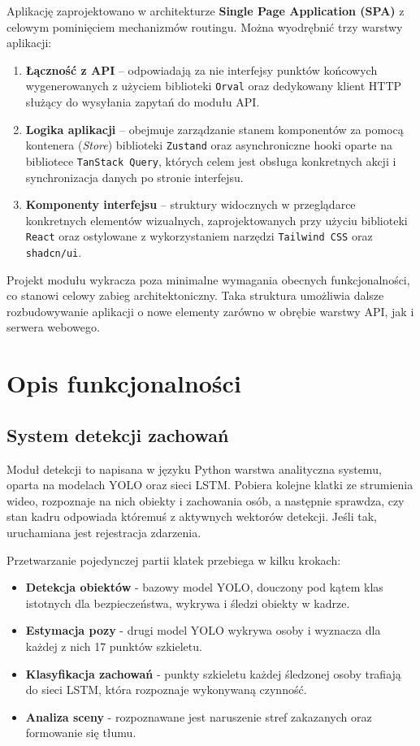 Aplikację zaprojektowano w architekturze \textbf{Single Page Application (SPA)} z celowym pominięciem mechanizmów routingu. Można wyodrębnić trzy warstwy aplikacji: 
\begin{enumerate}
    \item \textbf{Łączność z API} -- odpowiadają za nie interfejsy punktów końcowych wygenerowanych z użyciem biblioteki \texttt{Orval} oraz dedykowany klient HTTP służący do wysyłania zapytań do modułu API.
    \item \textbf{Logika aplikacji} -- obejmuje zarządzanie stanem komponentów za pomocą kontenera (\textit{Store}) biblioteki \texttt{Zustand} oraz asynchroniczne hooki oparte na bibliotece \texttt{TanStack Query}, których celem jest obsługa konkretnych akcji i synchronizacja danych po stronie interfejsu.
    \item \textbf{Komponenty interfejsu} -- struktury widocznych w przeglądarce konkretnych elementów wizualnych, zaprojektowanych przy użyciu biblioteki \texttt{React} oraz ostylowane z wykorzystaniem narzędzi \texttt{Tailwind CSS} oraz \texttt{shadcn/ui}.
\end{enumerate}

Projekt modułu wykracza poza minimalne wymagania obecnych funkcjonalności, co stanowi celowy zabieg architektoniczny. Taka struktura umożliwia dalsze rozbudowywanie aplikacji o nowe elementy zarówno w obrębie warstwy API, jak i serwera webowego.


\section{Opis funkcjonalności}

\subsection{System detekcji zachowań}


Moduł detekcji to napisana w języku Python warstwa analityczna systemu, oparta na modelach YOLO oraz sieci LSTM. Pobiera kolejne klatki ze strumienia wideo, rozpoznaje na nich obiekty i zachowania osób, a następnie sprawdza, czy stan kadru odpowiada któremuś z aktywnych wektorów detekcji. Jeśli tak, uruchamiana jest rejestracja zdarzenia.

Przetwarzanie pojedynczej partii klatek przebiega w kilku krokach:
\begin{itemize}
    \item \textbf{Detekcja obiektów} - bazowy model YOLO, douczony pod kątem klas istotnych dla bezpieczeństwa, wykrywa i śledzi obiekty w kadrze.
    \item \textbf{Estymacja pozy} - drugi model YOLO wykrywa osoby i wyznacza dla każdej z nich 17 punktów szkieletu.
    \item \textbf{Klasyfikacja zachowań} - punkty szkieletu każdej śledzonej osoby trafiają do sieci LSTM, która rozpoznaje wykonywaną czynność.
    \item \textbf{Analiza sceny} - rozpoznawane jest naruszenie stref zakazanych oraz formowanie się tłumu.
\end{itemize}

